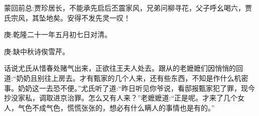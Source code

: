 

\begin{parag}
    \begin{note}蒙回前总:贾珍居长，不能承先启后丕震家风，兄弟问柳寻花，父子呼幺喝六，贾氏宗风，其坠地矣。安得不发先灵一叹！\end{note}
\end{parag}


\begin{parag}
    \begin{note}庚:乾隆二十一年五月初七日对清。\end{note}
\end{parag}


\begin{parag}
    \begin{note}庚:缺中秋诗俟雪芹。\end{note}
\end{parag}


\begin{parag}
    话说尤氏从惜春处赌气出来，正欲往王夫人处去。跟从的老嬷嬷们因悄悄的回道:“奶奶且别往上房去。才有甄家的几个人来，还有些东西，不知是作什么机密事。奶奶这一去恐不便。”尤氏听了道:“昨日听见你爷说，看邸报甄家犯了罪，现今抄没家私，调取进京治罪。怎么又有人来？”老嬷嬷道:“正是呢。才来了几个女人，气色不成气色，慌慌张张的，想必有什么瞒人的事情也是有的。”
\end{parag}


